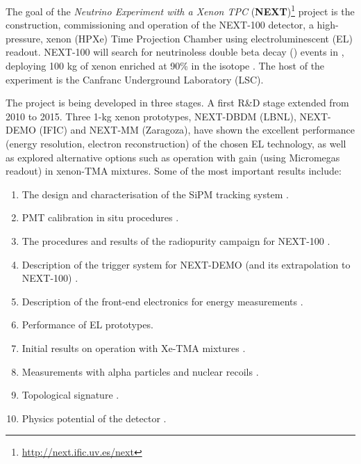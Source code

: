 
The goal of the {\em Neutrino Experiment with a Xenon TPC} ({\bf NEXT})\footnote{\url{http://next.ific.uv.es/next}} project is the construction, commissioning and operation of the NEXT-100 detector, a high-pressure, xenon (HPXe) Time Projection Chamber using electroluminescent (EL) readout. NEXT-100 will search for neutrinoless double beta decay  (\bbonu) events in \XE, deploying 100 kg of xenon enriched at 90\% in the isotope \XE. The host of the experiment is the Canfranc Underground Laboratory (LSC). 

The project is being developed in three stages. A first R\&D stage extended from 2010 to 2015. Three 1-kg xenon prototypes, 
NEXT-DBDM (LBNL), NEXT-DEMO (IFIC) and NEXT-MM (Zaragoza), have shown the excellent performance (energy resolution, electron reconstruction) of the chosen EL technology, as well as explored alternative options such as operation with gain (using Micromegas readout) in xenon-TMA mixtures. 
Some of the most important results include:

\begin{enumerate}
\item The design and characterisation of the SiPM tracking system \cite{Alvarez:2012haa}.
\item PMT calibration in situ procedures \cite{Freitas:2015tha}.
\item The procedures and results of the radiopurity campaign for NEXT-100 \cite{Alvarez:2012as, Alvarez:2014kvs, Cebrian:2015jna}.
\item Description of the trigger system for NEXT-DEMO (and its extrapolation to NEXT-100)
\cite{Esteve:2012hy}.
\item Description of the front-end electronics for energy measurements \cite{Gil:2012sr}.  
\item Performance of EL prototypes\cite{Alvarez:2012hh, Alvarez:2013gxa, Alvarez:2012hu,Lorca:2014sra}.   
\item Initial results on operation with Xe-TMA mixtures \cite{Alvarez:2013kqa, Alvarez:2013oha}.
\item Measurements with alpha particles and nuclear recoils \cite{Renner:2014mha, Serra:2014zda}.
\item Topological signature \cite{Ferrario:2015kta}.
\item Physics potential of the detector \cite{GomezCadenas:2012jv, MartinAlbo:2013ve,Gomez-Cadenas:2013lta, Martin-Albo:2015rhw}.              
\end{enumerate}

